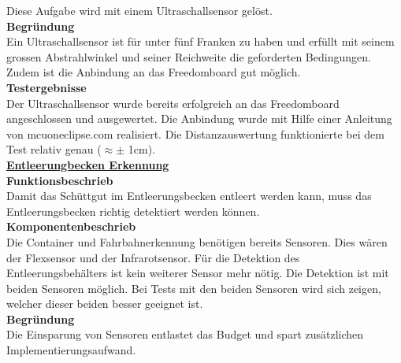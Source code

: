 Diese Aufgabe wird mit einem Ultraschallsensor gelöst. \\[0.2cm]
\textbf{Begründung}\\[0.2cm]
Ein Ultraschallsensor ist für unter fünf Franken zu haben und erfüllt mit seinem grossen Abstrahlwinkel und seiner Reichweite die geforderten Bedingungen. Zudem ist die Anbindung an das Freedomboard gut möglich.\\[0.2cm]
\textbf{Testergebnisse}\\[0.2cm]
Der Ultraschallsensor wurde bereits erfolgreich an das Freedomboard angeschlossen und  ausgewertet. Die Anbindung wurde mit Hilfe einer Anleitung von mcuoneclipse.com realisiert. Die Distanzauswertung funktionierte bei dem Test relativ genau ($\approx \pm $ 1cm).\\[0.2cm]
%
\underline{\textbf{Entleerungbecken Erkennung}} \\[0.2cm]
\textbf{Funktionsbeschrieb}\\[0.2cm]
Damit das Schüttgut im Entleerungsbecken entleert werden kann, muss das Entleerungsbecken richtig detektiert werden können. \\[0.2cm]
\textbf{Komponentenbeschrieb}\\[0.2cm]
Die Container und Fahrbahnerkennung benötigen bereits Sensoren. Dies wären der Flexsensor und der Infrarotsensor. Für die Detektion des Entleerungsbehälters ist kein weiterer Sensor mehr nötig. Die Detektion ist mit beiden Sensoren möglich. Bei Tests mit den beiden Sensoren wird sich zeigen, welcher dieser beiden besser geeignet ist.\\[0.2cm]
\textbf{Begründung}\\[0.2cm]
Die Einsparung von Sensoren entlastet das Budget und spart zusätzlichen Implementierungsaufwand.\\[0.2cm]
